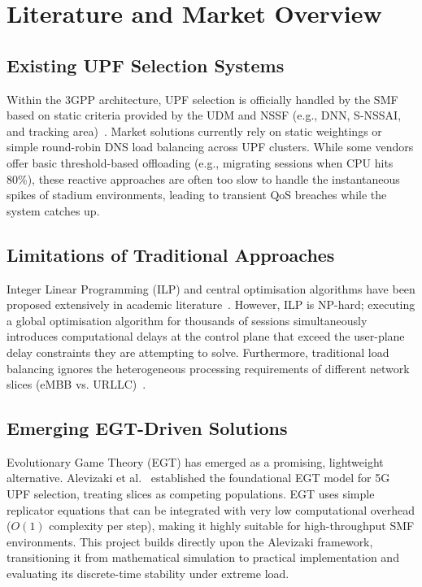 \documentclass[11pt,a4paper,english]{article}
\begin{document}
\newpage

\section{Literature and Market Overview}
\subsection{Existing UPF Selection Systems}
Within the 3GPP architecture, UPF selection is officially handled by the SMF based on static criteria provided by the UDM and NSSF (e.g., DNN, S-NSSAI, and tracking area)~\cite{3gpp_ts23501}. Market solutions currently rely on static weightings or simple round-robin DNS load balancing across UPF clusters. While some vendors offer basic threshold-based offloading (e.g., migrating sessions when CPU hits 80\%), these reactive approaches are often too slow to handle the instantaneous spikes of stadium environments, leading to transient QoS breaches while the system catches up.

\subsection{Limitations of Traditional Approaches}
Integer Linear Programming (ILP) and central optimisation algorithms have been proposed extensively in academic literature~\cite{LeyvaUPC2023}. However, ILP is NP-hard; executing a global optimisation algorithm for thousands of sessions simultaneously introduces computational delays at the control plane that exceed the user-plane delay constraints they are attempting to solve. Furthermore, traditional load balancing ignores the heterogeneous processing requirements of different network slices (eMBB vs. URLLC)~\cite{popovski2018wireless, zhang2019network}.

\subsection{Emerging EGT-Driven Solutions}
Evolutionary Game Theory (EGT) has emerged as a promising, lightweight alternative. Alevizaki et al.~\cite{Alevizaki2021upf} established the foundational EGT model for 5G UPF selection, treating slices as competing populations. EGT uses simple replicator equations that can be integrated with very low computational overhead ($O(1)$ complexity per step), making it highly suitable for high-throughput SMF environments. This project builds directly upon the Alevizaki framework, transitioning it from mathematical simulation to practical implementation and evaluating its discrete-time stability under extreme load.
\end{document}
